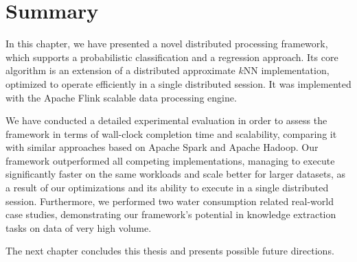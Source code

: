 
\graphicspath{{Papers/SpringerJournalOfBigData/}}

\section{Summary}
\label{sec:concl_knn}

In this chapter, we have presented a novel distributed processing framework, which supports a probabilistic classification and a regression approach. Its core algorithm is an extension of a distributed approximate $k$NN implementation, optimized to operate efficiently in a single distributed session. It was implemented with the Apache Flink scalable data processing engine.

We have conducted a detailed experimental evaluation in order to assess the framework in terms of wall-clock completion time and scalability, comparing it with similar approaches based on Apache Spark and Apache Hadoop. Our framework outperformed all competing implementations, managing to execute significantly faster on the same workloads and scale better for larger datasets, as a result of our optimizations and its ability to execute in a single distributed session. Furthermore, we performed two water consumption related real-world case studies, demonstrating our framework's potential in knowledge extraction tasks on data of very high volume.

The next chapter concludes this thesis and presents possible future directions.